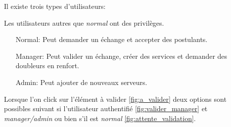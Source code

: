     Il existe trois types d'utilisateurs:
    \begin{center}
    \end{center}

    Les utilisateurs autres que \textit{normal} ont des privilèges.

    \begin{itemize}
        \item [Normal:] Peut demander un échange et accepter des postulants.
        \item [Manager:] Peut valider un échange, créer des services et demander des doubleurs en renfort.
        \item [Admin:] Peut ajouter de nouveaux serveurs. 
    \end{itemize}
    
    Lorsque l'on click sur l'élément à valider \ref{fig:a_valider} deux options
    sont possibles suivant si l'utilisateur authentifié \ref{fig:valider_manager} et \textit{manager/admin} ou bien 
    s'il est \textit{normal} \ref{fig:attente_validation}.


